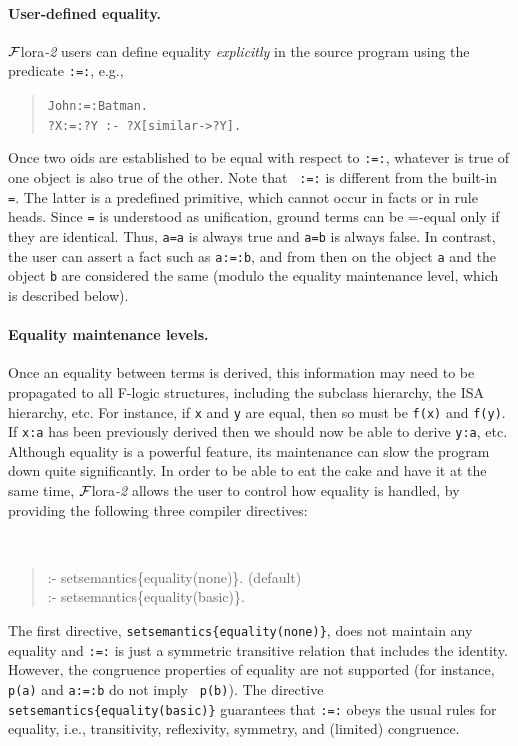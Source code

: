 \documentclass[11pt]{article}
\newcommand{\FLORA}{{\mbox{\sc ${\cal F}${lora}\rm\emph{-2}}}\xspace}
\newcommand{\fl}{\mbox{F-logic}\xspace}
\begin{document}
\paragraph{User-defined equality.}
\FLORA users can define equality \emph{explicitly} in the source
program using the predicate {\tt :=:}, e.g.,
\begin{quote}
{\tt John:=:Batman.} \\
{\tt ?X:=:?Y :- ?X[similar->?Y].} \\
\end{quote}
Once two oids are established to be equal with respect to {\tt :=:},
whatever is true of one object is also true of the other. Note that {\tt
  :=:} is different from the built-in {\tt =}. The latter is a predefined
primitive, which cannot occur in facts or in rule heads.  
Since {\tt =} is understood as unification, ground terms can be 
  =-equal only if they are identical. Thus, {\tt a=a} is always true and
{\tt a=b} is always false. In contrast, the user can assert a fact such as
{\tt a:=:b}, and from then on the object {\tt a} and the object {\tt b} are
considered the same (modulo the equality maintenance level, which is
described below).       

\paragraph{Equality maintenance levels.}
Once an equality between terms is derived, this information may need to be
propagated to all \fl 
structures, including the subclass hierarchy, the ISA hierarchy, etc.
For instance, if {\tt x} and {\tt y} are equal, then so must be {\tt f(x)}
and {\tt f(y)}. If {\tt x:a} has been previously derived then we should now
be able to derive {\tt y:a}, etc. Although equality is a powerful
feature, its maintenance can slow the program down quite significantly.
In order to be able to eat the cake and have it at the same time, \FLORA
allows the user to control how equality is handled,
by providing the following three compiler directives:
{\tt
\begin{quote}
:- setsemantics\{equality(none)\}.  (default)\\
:- setsemantics\{equality(basic)\}.
\end{quote}
}

\noindent
The first directive, \mbox{\tt setsemantics\{equality(none)\}}, does not
maintain any equality and {\tt :=:} is just a symmetric transitive relation
that includes the identity. However,
the congruence properties of equality are not
supported (for instance, {\tt p(a)} and {\tt a:=:b} do not imply {\tt
  p(b)}). The directive
\mbox{\tt setsemantics\{equality(basic)\}} guarantees that {\tt :=:} obeys the
usual rules for equality, i.e., transitivity, reflexivity,
symmetry, and (limited) congruence.
\end{document}
